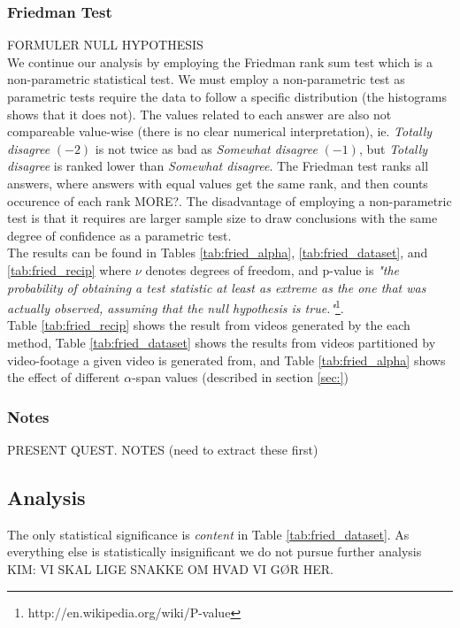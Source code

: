 \subsubsection{Friedman Test}
%
FORMULER NULL HYPOTHESIS\\ %
%
We continue our analysis by employing the Friedman rank sum test which is a non-parametric statistical test. We must employ a non-parametric test as parametric tests require the data to follow a specific distribution (the histograms shows that it does not). The values related to each answer are also not compareable value-wise (there is no clear numerical interpretation), ie. \textit{Totally disagree} $(-2)$ is not twice as bad as \textit{Somewhat disagree} $(-1)$, but \textit{Totally disagree} is ranked lower than \textit{Somewhat disagree}. The Friedman test ranks all answers, where answers with equal values get the same rank, and then counts occurence of each rank MORE?. The disadvantage of employing a non-parametric test is that it requires are larger sample size to draw conclusions with the same degree of confidence as a parametric test.\\ 
The results can be found in Tables \ref{tab:fried_alpha}, \ref{tab:fried_dataset}, and \ref{tab:fried_recip} where $\nu$ denotes degrees of freedom, and p-value is \textit{"the probability of obtaining a test statistic at least as extreme as the one that was actually observed, assuming that the null hypothesis is true."}\footnote{http://en.wikipedia.org/wiki/P-value}.\\



%
Table \ref{tab:fried_recip} shows the result from videos generated by the each method, Table \ref{tab:fried_dataset} shows the results from videos partitioned by video-footage a given video is generated from, and Table \ref{tab:fried_alpha} shows the effect of different $\alpha$-span values (described in section \ref{sec:})
%
\subsubsection{Notes}
%
PRESENT QUEST. NOTES (need to extract these first)
%
\subsection{Analysis}
%
The only statistical significance is \textit{content} in Table \ref{tab:fried_dataset}. As everything else is statistically insignificant we do not pursue further analysis KIM: VI SKAL LIGE SNAKKE OM HVAD VI GØR HER.
%
